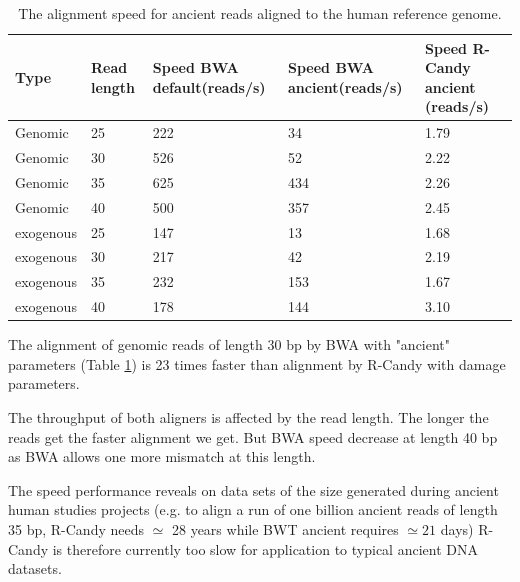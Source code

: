 \documentclass[11pt,a4paper]{report}
\begin{document}
\begin{table}[H]
  \begin{tabular}{ |p{2cm} |p{2cm} |p{2cm} |p{2cm} |p{2cm} | }
    \hline
	\footnotesize
  	\textbf{Type} 
  	&\textbf{\footnotesize Read length }
  	&\textbf{\footnotesize Speed BWA default\hspace{15pt}(reads/s) }
  	&\textbf{\footnotesize Speed BWA ancient\hspace{15pt}(reads/s)} 
  	&\textbf{\footnotesize Speed R-Candy ancient (reads/s)}\\ 
  	  \hline
 	  Genomic    & 25  & 222 &  34   &  1.79 \\ \hline
      Genomic    & 30  & 526 &  52   &  2.22 \\ \hline
      Genomic    & 35  & 625 &  434   &  2.26 \\ \hline
 	  Genomic	 & 40  & 500 &  357   &  2.45 \\ \hline
 	  exogenous  & 25  & 147 &  13   &  1.68 \\ \hline
      exogenous  & 30  & 217 &  42   &  2.19 \\ \hline
 	  exogenous  & 35  & 232 &  153   &  1.67 \\ \hline
 	  exogenous  & 40  & 178 &  144   &  3.10 \\ \hline
   \end{tabular}
   \caption{The alignment speed for ancient reads aligned to the human reference genome.}
\label{speed-RG}
\end{table}



The alignment of genomic reads of length 30 bp by BWA with "ancient" parameters 
(Table \ref{speed-RG}) is 23 times faster than alignment by R-Candy with damage 
parameters.  

The throughput of both aligners is affected by the read length. The longer the
reads get the faster alignment we get. But BWA speed decrease at length 40 bp 
as BWA allows one more mismatch at this length.

The speed performance reveals on data sets of the size generated during ancient 
human studies projects (e.g. to align a run of one billion ancient reads of length
35 bp, R-Candy needs $\simeq $ 28 years while BWT ancient requires $\simeq 21$
days) R-Candy is therefore currently too slow for application to typical ancient 
DNA datasets.
\end{document}

